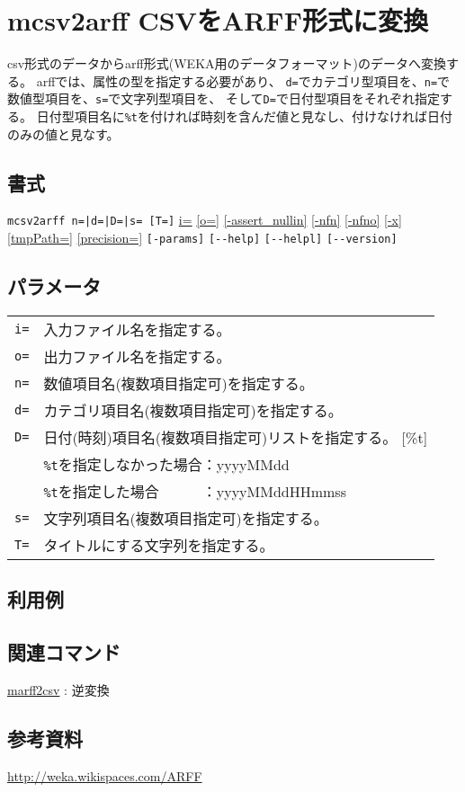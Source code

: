 
%

\section{mcsv2arff CSVをARFF形式に変換\label{sect:mcsv2arff}}
csv形式のデータからarff形式(WEKA用のデータフォーマット)のデータへ変換する。
arffでは、属性の型を指定する必要があり、
\verb|d=|でカテゴリ型項目を、\verb|n=|で数値型項目を、\verb|s=|で文字列型項目を、
そして\verb|D=|で日付型項目をそれぞれ指定する。
日付型項目名に\verb|%t|を付ければ時刻を含んだ値と見なし、付けなければ日付のみの値と見なす。

\subsection*{書式}
\verb/mcsv2arff n=|d=|D=|s= [T=]/
\hyperref[sect:option_i]{i=}
\hyperref[sect:option_o]{[o=]}
\hyperref[sect:option_assert_nullin]{[-assert\_nullin]}
\hyperref[sect:option_nfn]{[-nfn]}
\hyperref[sect:option_nfno]{[-nfno]}
\hyperref[sect:option_x]{[-x]}
\hyperref[sect:option_option_tmppath]{[tmpPath=]}
\hyperref[sect:option_precision]{[precision=]}
\verb|[-params]|
\verb|[--help]|
\verb|[--helpl]|
\verb|[--version]|\\

\subsection*{パラメータ}
\begin{table}[htbp]
{\small
\begin{tabular}{ll}
\verb|i=|    & 入力ファイル名を指定する。\\
\verb|o=|    & 出力ファイル名を指定する。\\
\verb|n=|    & 数値項目名(複数項目指定可)を指定する。\\
\verb|d=|    & カテゴリ項目名(複数項目指定可)を指定する。\\
\verb|D=|    & 日付(時刻)項目名(複数項目指定可)リストを指定する。 [\%{t}]\\
             & \verb|%t|を指定しなかった場合：yyyyMMdd\\
             & \verb|%t|を指定した場合　　　：yyyyMMddHHmmss\\
\verb|s=|    & 文字列項目名(複数項目指定可)を指定する。\\
\verb|T=|    & タイトルにする文字列を指定する。\\
\end{tabular} 
}
\end{table} 


\subsection*{利用例}

\subsection*{関連コマンド}

\hyperref[sect:marff2csv]{marff2csv} : 逆変換


\subsection*{参考資料}
\href{http://weka.wikispaces.com/ARFF}{http://weka.wikispaces.com/ARFF}

%
